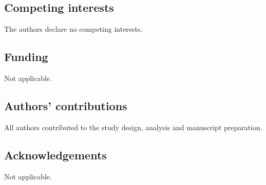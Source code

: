 \documentclass[11pt,letterpaper]{article}
\begin{document}
\subsection*{Competing interests}
The authors declare no competing interests.

\subsection*{Funding}
Not applicable.

\subsection*{Authors' contributions}
All authors contributed to the study design, analysis and manuscript preparation.

\subsection*{Acknowledgements}
Not applicable.



\end{document}

